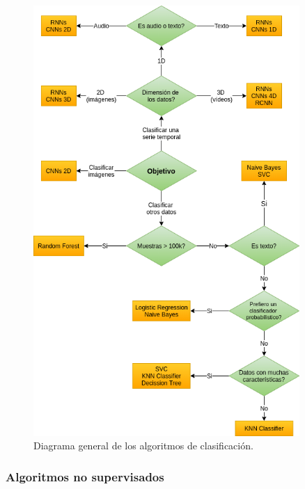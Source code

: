 \documentclass[a4paper,12pt]{article}
\begin{document}
\begin{figure}[H]
	\begin{center}				
		\includegraphics[width=0.9\textwidth]{classificationdiagram.png}
		\caption{Diagrama general de los algoritmos de clasificación.}
		\label{fig:classificationdiagram.}
	\end{center}
\end{figure}

\subsubsection{Algoritmos no supervisados}
\end{document}
